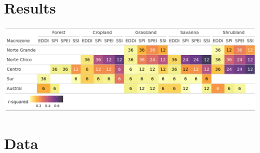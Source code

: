 \documentclass[
  authoryear,
  preprint,
  3p,
  onecolumn]{elsarticle}
\begin{document}
\begin{frontmatter}








        





\end{frontmatter}
    
\renewcommand\thesection{S\arabic{section}}
\renewcommand\thefigure{S\arabic{figure}}
\renewcommand\thetable{S\arabic{table}}

\section{Results}\label{results}

\includegraphics[width=1\textwidth,height=\textheight]{figs/tabla_r_cor_macro_indice.png}

\section{Data}\label{data}
\end{document}
